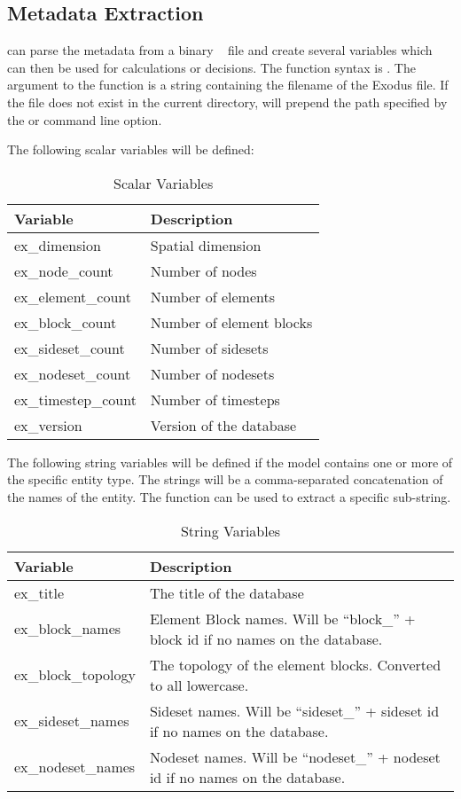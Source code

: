 \subsection{\exo{} Metadata Extraction} \aprepro{} can parse the
metadata from a binary \exo{}~\cite{exodus} file and create several
variables which can then be used for calculations or decisions.  The
function syntax is . The
argument to the function is a string containing the filename of the
Exodus file.  If the file does not exist in the current directory,
\aprepro{} will prepend the path specified by the  or
 command line option.

The following scalar variables will be defined:

\begin{longtable}{lp{4.0in}}
\caption{\exo{} Scalar Variables}\\
Variable              & Description \\
\hline
\endhead
ex\_dimension        & Spatial dimension \\
ex\_node\_count      & Number of nodes \\
ex\_element\_count   & Number of elements \\
ex\_block\_count     & Number of element blocks \\
ex\_sideset\_count   & Number of sidesets \\
ex\_nodeset\_count   & Number of nodesets \\
ex\_timestep\_count  & Number of timesteps \\
ex\_version          & Version of the \exo{} database \\
\hline 
\end{longtable}

The following string variables will be defined if the model contains
one or more of the specific entity type.  The strings will be a
comma-separated concatenation of the names of the entity.  The
 function can be used to extract a specific sub-string.

\begin{longtable}{lp{4.0in}}
\caption{\exo{} String Variables}\\
Variable              & Description \\
\hline
\endhead
ex\_title            & The title of the database \\
ex\_block\_names     & Element Block names.  Will be ``block\_'' +
block id if no names on the database. \\
ex\_block\_topology  & The topology of the element blocks.  Converted
to all lowercase. \\
ex\_sideset\_names   & Sideset names.  Will be ``sideset\_'' + sideset
id if no names on the database. \\
ex\_nodeset\_names   & Nodeset names.  Will be ``nodeset\_'' + nodeset
id if no names on the database. \\
\hline 
\end{longtable}

